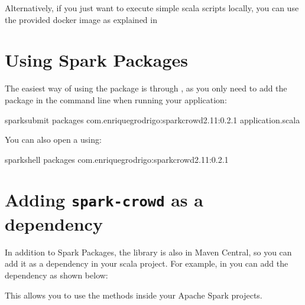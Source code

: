 \documentclass[letterpaper,10pt,english]{sphinxmanual}
\begin{document}
Alternatively, if you just want to execute simple scala scripts locally,
you can use the provided docker image as explained in {\hyperref[\detokenize{usage/quickstart:quickstart}]{}}


\section{Using Spark Packages}
\label{\detokenize{usage/installation:using-spark-packages}}
The easiest way of using the package is through , as you only need to add the package in the command line when running your
application:

%
\begin{sphinxVerbatim}[commandchars=\\\{\}]
spark\PYGZhy{}submit \PYGZhy{}\PYGZhy{}packages com.enriquegrodrigo:spark\PYGZhy{}crowd\PYGZus{}2.11:0.2.1 application.scala
\end{sphinxVerbatim}

You can also open a  using:

%
\begin{sphinxVerbatim}[commandchars=\\\{\}]
spark\PYGZhy{}shell \PYGZhy{}\PYGZhy{}packages com.enriquegrodrigo:spark\PYGZhy{}crowd\PYGZus{}2.11:0.2.1
\end{sphinxVerbatim}


\section{Adding \texttt{spark-crowd} as a dependency}
\label{\detokenize{usage/installation:adding-it-as-a-dependency}}
In addition to Spark Packages, the library is also in Maven Central, so you can add it as a dependency in your scala project.
For example, in  you can add the dependency as shown below:

%
\begin{sphinxVerbatim}[commandchars=\\\{\}]
      
\end{sphinxVerbatim}

This allows you to use the methods inside your Apache Spark projects.
\end{document}
